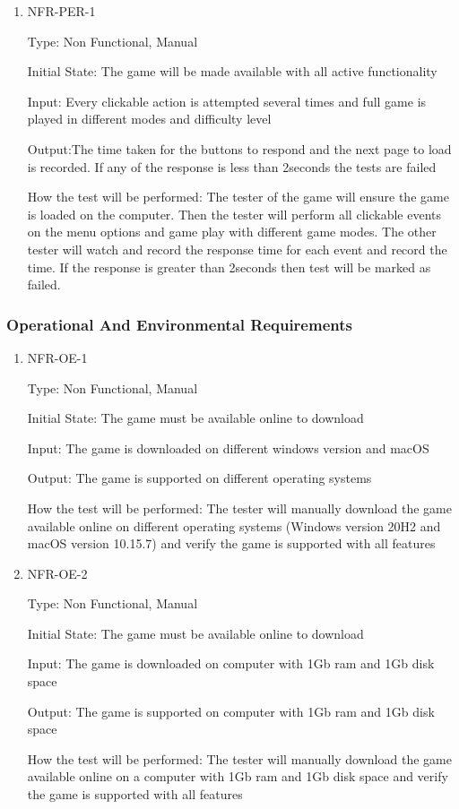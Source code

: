 \documentclass[12pt, titlepage]{article}
\begin{document}
\begin{enumerate}
	\item{ NFR-PER-1\\}
	
Type: Non Functional, Manual

Initial State: The game will be made available with all active functionality

Input: Every clickable action is attempted several times and full game is played in different modes and difficulty level

Output:The time taken for the buttons to respond and the next page to load is recorded. If any of the response is less than 2seconds the tests are failed

How the test will be performed: The tester of the game will ensure the game is loaded on the computer. Then the tester will perform all clickable events on the menu options and game play with different game modes. The other tester will watch and record the response time for each event and record the time. If the response is greater than 2seconds then test will be marked as failed.
\end{enumerate}

\subsubsection{Operational And Environmental Requirements}

\begin{enumerate}	
	\item{ NFR-OE-1\\} 
	
Type: Non Functional, Manual

Initial State: The game must be available online to download

Input: The game is downloaded on different windows version and macOS

Output: The game is supported on different operating systems

How the test will be performed: The tester will manually download the game available online on different operating systems (Windows version 20H2 and macOS version 10.15.7) and verify the game is supported with all features

	\item{ NFR-OE-2\\} 
	
Type: Non Functional, Manual

Initial State: The game must be available online to download

Input: The game is downloaded on computer with 1Gb ram and 1Gb disk space

Output: The game is supported on computer with 1Gb ram and 1Gb disk space

How the test will be performed: The tester will manually download the game available online on a computer with 1Gb ram and 1Gb disk space and verify the game is supported with all features
\end{enumerate}
\end{document}
